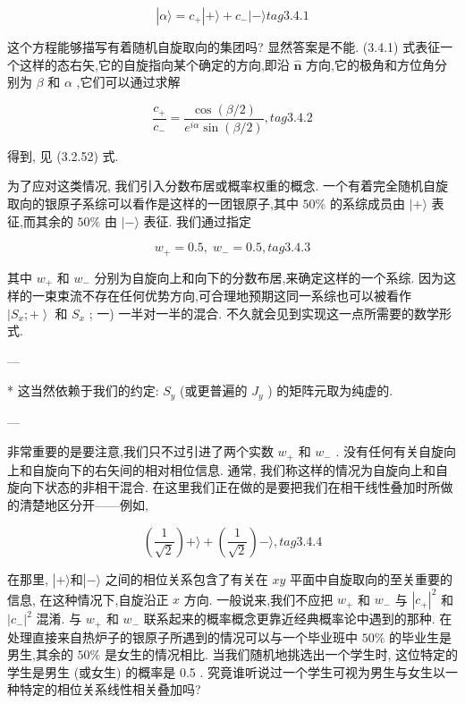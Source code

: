 $$
\left| {\alpha \rangle = {c}_{ + }}\right| + \rangle + {c}_{ - }| - \rangle tag{3. 4.1}
$$

这个方程能够描写有着随机自旋取向的集团吗? 显然答案是不能. (3.4.1) 式表征一个这样的态右矢,它的自旋指向某个确定的方向,即沿 $\widehat{\mathbf{n}}$ 方向,它的极角和方位角分别为 $\beta$ 和 $\alpha$ ,它们可以通过求解

$$
\frac{{c}_{ + }}{{c}_{ - }} = \frac{\cos \left( {\beta /2}\right) }{{e}^{i\alpha }\sin \left( {\beta /2}\right) }, tag{3. 4.2}
$$

得到, 见 (3.2.52) 式.

为了应对这类情况, 我们引入分数布居或概率权重的概念. 一个有着完全随机自旋取向的银原子系综可以看作是这样的一团银原子,其中 ${50}\%$ 的系综成员由 $| + \rangle$ 表征,而其余的 ${50}\%$ 由 $| - \rangle$ 表征. 我们通过指定

$$
{w}_{ + } = {0.5},\;{w}_{ - } = {0.5}, tag{3.4.3}
$$

其中 ${w}_{ + }$ 和 ${w}_{ - }$ 分别为自旋向上和向下的分数布居,来确定这样的一个系综. 因为这样的一束束流不存在任何优势方向,可合理地预期这同一系综也可以被看作 $\left| {{S}_{x}; + }\right\rangle$ 和 ${S}_{x}$ ; 一) 一半对一半的混合. 不久就会见到实现这一点所需要的数学形式.

---

* 这当然依赖于我们的约定: ${S}_{y}$ (或更普遍的 ${J}_{y}$ ) 的矩阵元取为纯虚的.

---

非常重要的是要注意,我们只不过引进了两个实数 ${w}_{ + }$ 和 ${w}_{ - }$ . 没有任何有关自旋向上和自旋向下的右矢间的相对相位信息. 通常, 我们称这样的情况为自旋向上和自旋向下状态的非相干混合. 在这里我们正在做的是要把我们在相干线性叠加时所做的清楚地区分开——例如,

$$
\left( \frac{1}{\sqrt{2}}\right) + \rangle + \left( \frac{1}{\sqrt{2}}\right) - \rangle , tag{3. 4.4}
$$

在那里, $\left| {+\rangle \text{和}}\right| - \rangle$ 之间的相位关系包含了有关在 ${xy}$ 平面中自旋取向的至关重要的信息, 在这种情况下,自旋沿正 $x$ 方向. 一般说来,我们不应把 ${w}_{ + }$ 和 ${w}_{ - }$ 与 ${\left| {c}_{ + }\right| }^{2}$ 和 ${\left| {c}_{ - }\right| }^{2}$ 混淆. 与 ${w}_{ + }$ 和 ${w}_{ - }$ 联系起来的概率概念更靠近经典概率论中遇到的那种. 在处理直接来自热炉子的银原子所遇到的情况可以与一个毕业班中 ${50}\%$ 的毕业生是男生,其余的 ${50}\%$ 是女生的情况相比. 当我们随机地挑选出一个学生时, 这位特定的学生是男生 (或女生) 的概率是 0.5 . 究竟谁听说过一个学生可视为男生与女生以一种特定的相位关系线性相关叠加吗?

